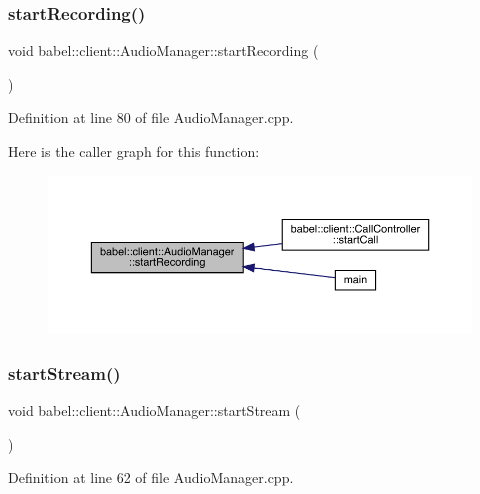 \subsubsection{\texorpdfstring{start\+Recording()}{startRecording()}}
{\footnotesize\ttfamily void babel\+::client\+::\+Audio\+Manager\+::start\+Recording (\begin{DoxyParamCaption}{ }\end{DoxyParamCaption})}



Definition at line 80 of file Audio\+Manager.\+cpp.

Here is the caller graph for this function\+:\nopagebreak
\begin{figure}[H]
\begin{center}
\leavevmode
\includegraphics[width=350pt]{classbabel_1_1client_1_1_audio_manager_a71802aa6bb9e397add7f3d7112d35d98_icgraph}
\end{center}
\end{figure}
\mbox{\label{classbabel_1_1client_1_1_audio_manager_a2cea1058232cdce07789770bd1e4b268}} 
\subsubsection{\texorpdfstring{start\+Stream()}{startStream()}}
{\footnotesize\ttfamily void babel\+::client\+::\+Audio\+Manager\+::start\+Stream (\begin{DoxyParamCaption}{ }\end{DoxyParamCaption})}



Definition at line 62 of file Audio\+Manager.\+cpp.


